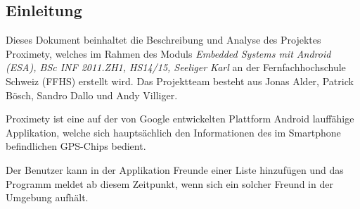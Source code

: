 \subsection{Einleitung}
Dieses Dokument beinhaltet die Beschreibung und Analyse des Projektes Proximety, welches im Rahmen des Moduls \emph{Embedded Systems mit Android (ESA), BSc INF 2011.ZH1, HS14/15, Seeliger Karl} an der Fernfachhochschule Schweiz (FFHS) erstellt wird. Das Projektteam besteht aus Jonas Alder, Patrick Bösch, Sandro Dallo und Andy Villiger.

Proximety ist eine auf der von Google entwickelten Plattform Android lauffähige Applikation, welche sich hauptsächlich den Informationen des im Smartphone befindlichen GPS-Chips bedient.

Der Benutzer kann in der Applikation Freunde einer Liste hinzufügen und das Programm meldet ab diesem Zeitpunkt, wenn sich ein solcher Freund in der Umgebung aufhält.